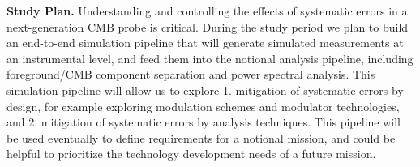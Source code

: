 \textbf{Study Plan.}  Understanding and controlling the effects of systematic errors in a next-generation CMB probe is critical.  During the study period we plan to build an end-to-end simulation pipeline that will generate simulated measurements at an instrumental level, and feed them into the notional analysis pipeline, including foreground/CMB component separation and power spectral analysis.  This simulation pipeline will allow us to explore 1. mitigation of systematic errors by design, for example exploring modulation schemes and modulator technologies, and 2. mitigation of systematic errors by analysis techniques.  This pipeline will be used eventually to define requirements for a notional mission, and could be helpful to prioritize the technology development needs of a future mission.


